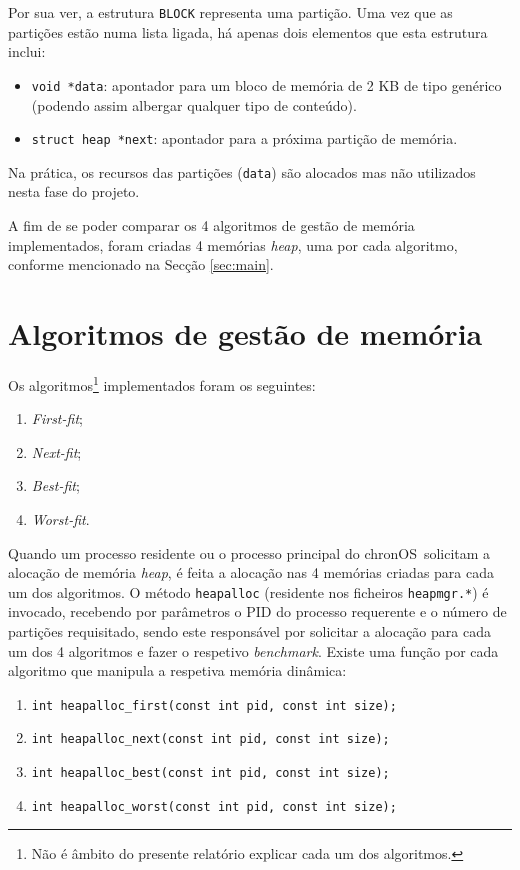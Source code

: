 \documentclass[10pt,oneside]{estiloUBI}
\newcommand{\chronOS}{\textsf{chronOS}}
\begin{document}
	Por sua ver, a estrutura \verb|BLOCK| representa uma partição. Uma vez que as partições estão numa lista ligada, há apenas dois elementos que esta estrutura inclui:
	
	\begin{itemize}
		\item \texttt{void *data}: apontador para um bloco de memória de 2 KB de tipo genérico (podendo assim albergar qualquer tipo de conteúdo).
		\item \texttt{struct heap *next}: apontador para a próxima partição de memória.
	\end{itemize}
	
	Na prática, os recursos das partições (\verb|data|) são alocados mas não utilizados nesta fase do projeto.
	
	A fim de se poder comparar os 4 algoritmos de gestão de memória implementados, foram criadas 4 memórias \textit{heap}, uma por cada algoritmo, conforme mencionado na Secção \ref{sec:main}.
	
	
	\section{Algoritmos de gestão de memória}
	\label{ssec:heap:algoithms}
	
	Os algoritmos\footnote{Não é âmbito do presente relatório explicar cada um dos algoritmos.} implementados foram os seguintes:
	
	\begin{enumerate}
		\item \textit{First-fit};
		\item \textit{Next-fit};
		\item \textit{Best-fit};
		\item \textit{Worst-fit}.
	\end{enumerate}

	Quando um processo residente ou o processo principal do \chronOS~solicitam a alocação de memória \textit{heap}, é feita a alocação nas 4 memórias criadas para cada um dos algoritmos. O método \verb|heapalloc| (residente nos ficheiros \verb|heapmgr.*|) é invocado, recebendo por parâmetros o PID do processo requerente e o número de partições requisitado, sendo este responsável por solicitar a alocação para cada um dos 4 algoritmos e fazer o respetivo \textit{benchmark}. Existe uma função por cada algoritmo que manipula a respetiva memória dinâmica:
	
	\begin{enumerate}
		\item \texttt{int heapalloc_first(const int pid, const int size);}
		\item \texttt{int heapalloc_next(const int pid, const int size);}
		\item \texttt{int heapalloc_best(const int pid, const int size);}
		\item \texttt{int heapalloc_worst(const int pid, const int size);}
	\end{enumerate}
	
\end{document}

